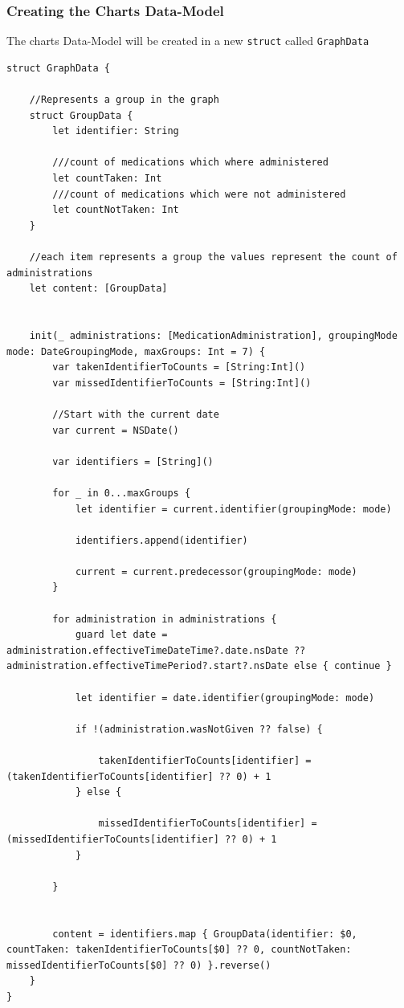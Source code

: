 \documentclass{article}
\begin{document}
\subsubsection{Creating the Charts Data-Model}\label{creating-the-charts-data-model}

The charts Data-Model will be created in a new \texttt{struct} called
\texttt{GraphData}

\begin{verbatim}
struct GraphData {

    //Represents a group in the graph
    struct GroupData {
        let identifier: String

        ///count of medications which where administered
        let countTaken: Int
        ///count of medications which were not administered
        let countNotTaken: Int
    }

    //each item represents a group the values represent the count of administrations
    let content: [GroupData]


    init(_ administrations: [MedicationAdministration], groupingMode mode: DateGroupingMode, maxGroups: Int = 7) {
        var takenIdentifierToCounts = [String:Int]()
        var missedIdentifierToCounts = [String:Int]()

        //Start with the current date
        var current = NSDate()

        var identifiers = [String]()

        for _ in 0...maxGroups {
            let identifier = current.identifier(groupingMode: mode)

            identifiers.append(identifier)

            current = current.predecessor(groupingMode: mode)
        }

        for administration in administrations {
            guard let date = administration.effectiveTimeDateTime?.date.nsDate ?? administration.effectiveTimePeriod?.start?.nsDate else { continue }

            let identifier = date.identifier(groupingMode: mode)

            if !(administration.wasNotGiven ?? false) {

                takenIdentifierToCounts[identifier] = (takenIdentifierToCounts[identifier] ?? 0) + 1
            } else {

                missedIdentifierToCounts[identifier] = (missedIdentifierToCounts[identifier] ?? 0) + 1
            }

        }


        content = identifiers.map { GroupData(identifier: $0, countTaken: takenIdentifierToCounts[$0] ?? 0, countNotTaken:  missedIdentifierToCounts[$0] ?? 0) }.reverse()
    }
}
\end{verbatim}
\end{document}
